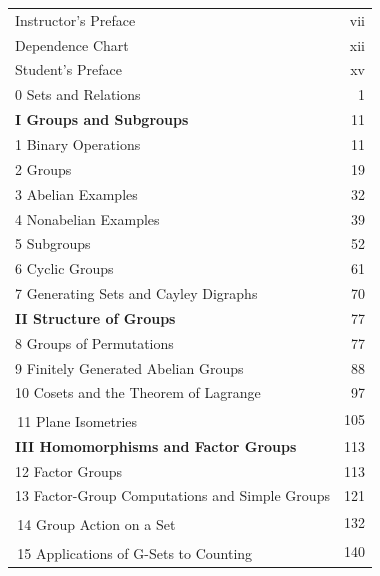 \documentclass[11pt,oneside]{article}
\begin{document}
\begin{longtable}{@{}p{.83\linewidth}r@{}}
Instructor’s Preface & vii\\
Dependence Chart & xii\\
Student’s Preface & xv\\
0 Sets and Relations & 1\\
\textbf{I Groups and Subgroups} & 11\\
\hspace*{1em}1 Binary Operations & 11\\
\hspace*{1em}2 Groups & 19\\
\hspace*{1em}3 Abelian Examples & 32\\
\hspace*{1em}4 Nonabelian Examples & 39\\
\hspace*{1em}5 Subgroups & 52\\
\hspace*{1em}6 Cyclic Groups & 61\\
\hspace*{1em}7 Generating Sets and Cayley Digraphs & 70\\
\textbf{II Structure of Groups} & 77\\
\hspace*{1em}8 Groups of Permutations & 77\\
\hspace*{1em}9 Finitely Generated Abelian Groups & 88\\
\hspace*{1em}10 Cosets and the Theorem of Lagrange & 97\\
\hspace*{1em}\textsuperscript{\BookInline{\dagger}}\,11 Plane Isometries & 105\\
\textbf{III Homomorphisms and Factor Groups} & 113\\
\hspace*{1em}12 Factor Groups & 113\\
\hspace*{1em}13 Factor-Group Computations and Simple Groups & 121\\
\hspace*{1em}\textsuperscript{\BookInline{\ddagger}}\,14 Group Action on a Set & 132\\
\hspace*{1em}\textsuperscript{\BookInline{\dagger}}\,15 Applications of G-Sets to Counting & 140\\

\end{longtable}
\end{document}
